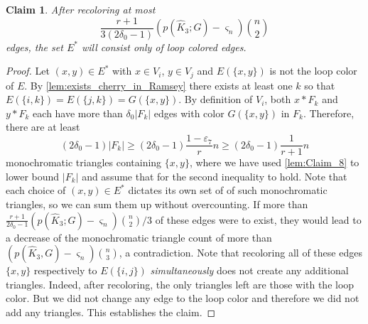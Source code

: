 \documentclass[a4paper,11pt]{article}
\newtheorem{claim}[theorem]{Claim}
\numberwithin{equation}{section}
\newcommand{\whiteboxedchar}[1]{
    \hspace{-2pt}\tikz[baseline=(char.base)]{
        \node[shape=rectangle, draw=black, thin, rounded corners=1.5pt, text=black, inner xsep=3pt, inner ysep=2pt] (char) {#1};
    }\hspace{-2pt}
}
\begin{document}
\begin{claim}
    After recoloring at most
    \begin{equation*}
         \frac{r+1}{3(2\delta_0-1)}(p(\hat K_3; G)-\varsigma_n)\binom{n}{2}
    \end{equation*}
    edges, the set $E^*$ will consist only of loop colored edges.
    \label{claim:f4}
\end{claim}
\begin{proof}
    Let $(x,y)\in E^\ast$ with $x\in V_i$, $y\in V_j$ and $E(\{x,y\})$ is not the loop color of $E$. By
    \cref{lem:exists_cherry_in_Ramsey} there exists at least one
    $k$ so that $E(\{i,k\}) = E(\{j,k\})=G(\{x,y\})$. By
    definition of $V_i$, both $x\ast F_k$ and $y\ast F_k$
    each have more than $\delta_0 |F_k|$ edges with color $G(\{x,y\})$ in $F_k$.
    Therefore, there are at least 
    \[
        (2\delta_0-1)|F_k|\ge (2\delta_0-1)\frac{1-\varepsilon_7}{r}n\ge (2\delta_0-1)\frac{1}{r+1}n
    \]
    monochromatic
    triangles containing $\{x,y\}$, where we have used \cref{lem:Claim_8} to lower bound $|F_k|$ and assume that \whiteboxedchar{$\varepsilon_7$ is sufficiently small} for the second inequality to hold. Note that each choice of $(x,y) \in
    E^\ast$ dictates its own set of of such monochromatic triangles, so we can sum them up without overcounting. If more than
    $\frac{r+1}{2\delta_0-1}(p(\hat K_3; G)-\varsigma_n)\binom{n}{2}/3$
    of these edges were to exist, they would lead to a decrease of the monochromatic triangle count of more than $(p(\hat K_3,G)-\varsigma_n)\binom{n}{3}$,
    a contradiction. Note that recoloring all of these edges $\{x,y\}$ respectively to $E(\{i,j\})$ \emph{simultaneously} does not create any additional triangles. Indeed, after recoloring, the only triangles left are those with the loop color. But we did not change any edge to the loop color and therefore we did not add any triangles. This establishes the claim.
\end{proof}
\end{document}

